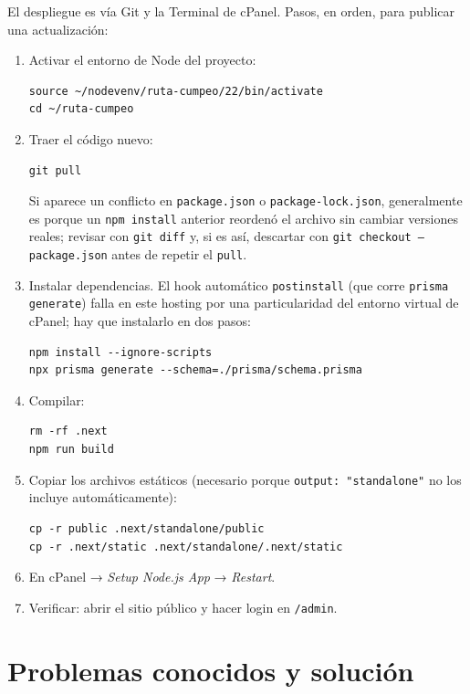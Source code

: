 \documentclass[11pt,a4paper]{article}
\begin{document}
El despliegue es vía Git y la Terminal de cPanel. Pasos, en orden, para publicar una actualización:

\begin{enumerate}
  \item Activar el entorno de Node del proyecto:
  \begin{lstlisting}
source ~/nodevenv/ruta-cumpeo/22/bin/activate
cd ~/ruta-cumpeo
  \end{lstlisting}

  \item Traer el código nuevo:
  \begin{lstlisting}
git pull
  \end{lstlisting}
  Si aparece un conflicto en \texttt{package.json} o \texttt{package-lock.json}, generalmente es porque un \texttt{npm install} anterior reordenó el archivo sin cambiar versiones reales; revisar con \texttt{git diff} y, si es así, descartar con \texttt{git checkout -- package.json} antes de repetir el \texttt{pull}.

  \item Instalar dependencias. El hook automático \texttt{postinstall} (que corre \texttt{prisma generate}) falla en este hosting por una particularidad del entorno virtual de cPanel; hay que instalarlo en dos pasos:
  \begin{lstlisting}
npm install --ignore-scripts
npx prisma generate --schema=./prisma/schema.prisma
  \end{lstlisting}

  \item Compilar:
  \begin{lstlisting}
rm -rf .next
npm run build
  \end{lstlisting}

  \item Copiar los archivos estáticos (necesario porque \texttt{output: "standalone"} no los incluye automáticamente):
  \begin{lstlisting}
cp -r public .next/standalone/public
cp -r .next/static .next/standalone/.next/static
  \end{lstlisting}

  \item En cPanel → \emph{Setup Node.js App} → \emph{Restart}.

  \item Verificar: abrir el sitio público y hacer login en \texttt{/admin}.
\end{enumerate}

\section{Problemas conocidos y solución}
\label{sec:troubleshoot}
\end{document}
